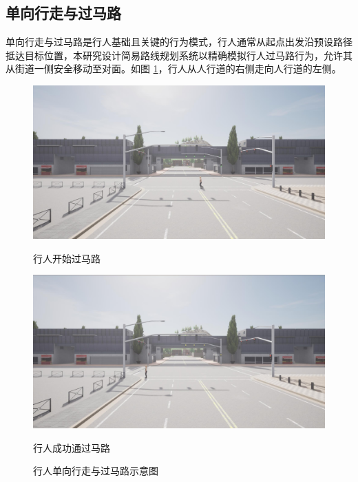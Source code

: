 \subsection{单向行走与过马路}
单向行走与过马路是行人基础且关键的行为模式，行人通常从起点出发沿预设路径抵达目标位置，本研究设计简易路线规划系统以精确模拟行人过马路行为，允许其从街道一侧安全移动至对面。如图 \ref{fig:crossing_path}，行人从人行道的右侧走向人行道的左侧。

\begin{figure}[H]
    \centering
    \begin{minipage}{1\textwidth} 
        \centering
        \includegraphics[width=\textwidth]{images/crossing_path1.pdf}
        \caption*{行人开始过马路}
    \end{minipage}
    
    \vspace{0.5cm}  

    \begin{minipage}{1\textwidth}
        \centering
        \includegraphics[width=\textwidth]{images/crossing_path2.pdf}
        \caption*{行人成功通过马路}
    \end{minipage}
    \caption{行人单向行走与过马路示意图}
    \label{fig:crossing_path}
\end{figure}


